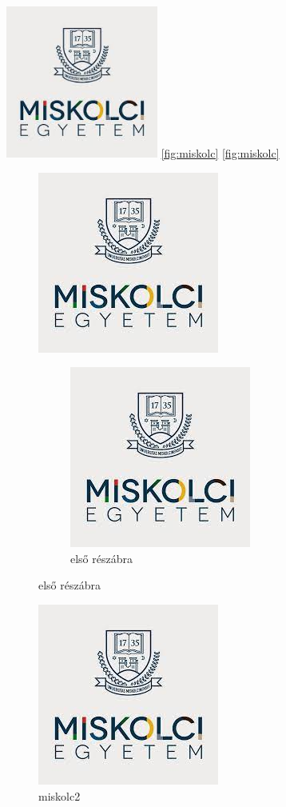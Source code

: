 \documentclass{article}
\begin{document}
\includegraphics[width=5cm]{miskolc.jpg}
\ref{fig:miskolc}
\ref{fig:miskolc}
\pagebreak


\begin{figure}
\includegraphics[width=0.4\linewidth]{miskolc.jpg}
\caption{miskolc}
\label{fig:miskolc}
\begin{subfigure}
\centering
\caption{első részábra}
\includegraphics{miskolc.jpg}
\end{subfigure}

\end{figure}
\begin{figure}
\includegraphics[width=0.4\linewidth,angle=180]{miskolc.jpg}
\caption{miskolc2}
\label{fig:miskolc2}

\end{figure}
\hulipsum[2-3]
\end{document}
